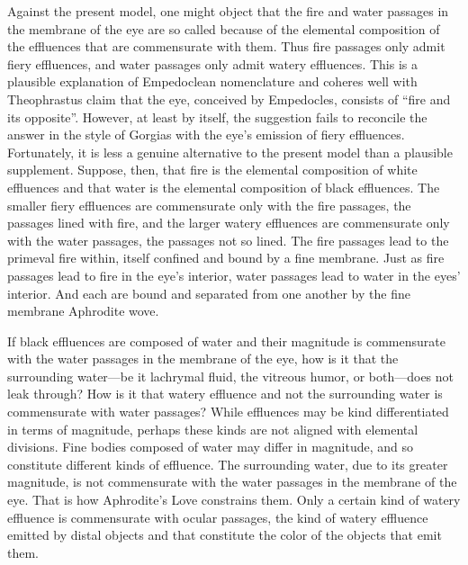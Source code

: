 Against the present model, one might object that the fire and water passages in the membrane of the eye are so called because of the elemental composition of the effluences that are commensurate with them. Thus fire passages only admit fiery effluences, and water passages only admit watery effluences. This is a plausible explanation of Empedoclean nomenclature and coheres well with Theophrastus claim that the eye, conceived by Empedocles, consists of ``fire and its opposite''. However, at least by itself, the suggestion fails to reconcile the answer in the style of Gorgias with the eye's emission of fiery effluences. Fortunately, it is less a genuine alternative to the present model than a plausible supplement. Suppose, then, that fire is the elemental composition of white effluences and that water is the elemental composition of black effluences. The smaller fiery effluences are commensurate only with the fire passages, the passages lined with fire, and the larger watery effluences are commensurate only with the water passages, the passages not so lined. The fire passages lead to the primeval fire within, itself confined and bound by a fine membrane. Just as fire passages lead to fire in the eye's interior, water passages lead to water in the eyes' interior. And each are bound and separated from one another by the fine membrane Aphrodite wove.

If black effluences are composed of water and their magnitude is commensurate with the water passages in the membrane of the eye, how is it that the surrounding water---be it lachrymal fluid, the vitreous humor, or both---does not leak through? How is it that watery effluence and not the surrounding water is commensurate with water passages? While effluences may be kind differentiated in terms of magnitude, perhaps these kinds are not aligned with elemental divisions. Fine bodies composed of water may differ in magnitude, and so constitute different kinds of effluence. The surrounding water, due to its greater magnitude, is not commensurate with the water passages in the membrane of the eye. That is how Aphrodite's Love constrains them. Only a certain kind of watery effluence is commensurate with ocular passages, the kind of watery effluence emitted by distal objects and that constitute the color of the objects that emit them. 

